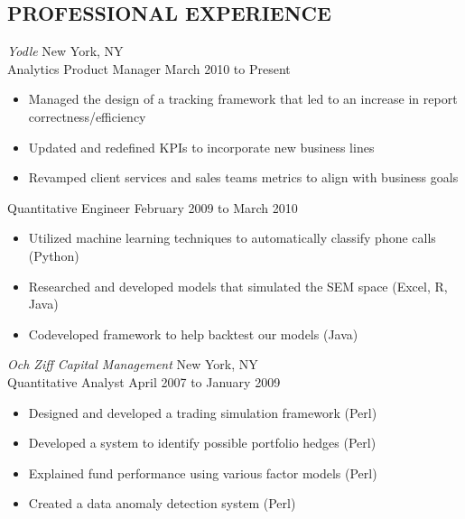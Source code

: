 \documentclass{res}
\begin{document}
\thispagestyle{empty} %


\address{80 Park Avenue, Apt 3D\hspace{0.1in}\vline\hspace{0.1in}Hoboken, NJ 07030
\hspace{0.1in}\vline\hspace{0.1in}
dangoldin@gmail.com\hspace{0.1in}\vline\hspace{0.1in}(201) 341-3384}

\begin{resume}

\section{PROFESSIONAL EXPERIENCE}
\vspace{1pt}
{\sl Yodle} \hfill New York, NY \\
Analytics Product Manager \hfill   March 2010 to Present
   \begin{itemize} \itemsep -2pt %
   \item Managed the design of a tracking framework that led to an increase in report correctness/efficiency
   \item Updated and redefined KPIs to incorporate new business lines
   \item Revamped client services and sales teams metrics to align with business goals
 \end{itemize} \vspace{-12pt}
Quantitative Engineer \hfill   February 2009 to March 2010
   \begin{itemize} \itemsep -2pt %
   \item Utilized machine learning techniques to automatically classify phone calls (Python)
   \item Researched and developed models that simulated the SEM space (Excel, R, Java)
   \item Codeveloped framework to help backtest our models (Java)
 \end{itemize} \vspace{-6pt}

{\sl Och Ziff Capital Management} \hfill New York, NY \\
Quantitative Analyst \hfill   April 2007 to January 2009  
   \begin{itemize} \itemsep -2pt %
   \item Designed and developed a trading simulation framework (Perl)
   \item Developed a system to identify possible portfolio hedges (Perl)
   \item Explained fund performance using various factor models (Perl)
   \item Created a data anomaly detection system (Perl)
 \end{itemize} \vspace{-6pt}


\end{resume}
\end{document}
